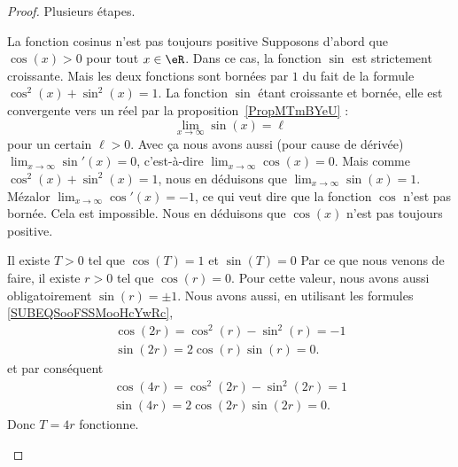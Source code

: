 \begin{proof}
	Plusieurs étapes.
	\begin{subproof}
		\item[La fonction cosinus n'est pas toujours positive]
		Supposons d'abord que \( \cos(x)>0\) pour tout \( x\in \eR\). Dans ce cas, la fonction \( \sin\) est strictement croissante. Mais les deux fonctions sont bornées par \( 1\) du fait de la formule \( \cos^2(x)+\sin^2(x)=1\). La fonction \( \sin\) étant croissante et bornée, elle est convergente vers un réel par la proposition~\ref{PropMTmBYeU} :
		\begin{equation}
			\lim_{x\to \infty} \sin(x)=\ell
		\end{equation}
		pour un certain \( \ell>0\). Avec ça nous avons aussi (pour cause de dérivée) \( \lim_{x\to \infty} \sin'(x)=0\), c'est-à-dire \( \lim_{x\to \infty} \cos(x)=0\). Mais comme \( \cos^2(x)+\sin^2(x)=1\), nous en déduisons que \( \lim_{x\to \infty} \sin(x)=1\). Mézalor \( \lim_{x\to \infty} \cos'(x)=-1\), ce qui veut dire que la fonction \( \cos\) n'est pas bornée. Cela est impossible. Nous en déduisons que \( \cos(x)\) n'est pas toujours positive.

		\item[Il existe \( T>0\) tel que \( \cos(T)=1\) et \( \sin(T)=0\)]
		Par ce que nous venons de faire, il existe \( r>0\) tel que \( \cos(r)=0\). Pour cette valeur, nous avons aussi obligatoirement \( \sin(r)=\pm 1\). Nous avons aussi, en utilisant les formules \eqref{SUBEQSooFSSMooHcYwRc},
		\begin{subequations}
			\begin{align}
				\cos(2r)=\cos^2(r)-\sin^2(r)=-1 \\
				\sin(2r)=2\cos(r)\sin(r)=0.
			\end{align}
		\end{subequations}
		et par conséquent
		\begin{subequations}
			\begin{align}
				\cos(4r)=\cos^2(2r)-\sin^2(2r)=1 \\
				\sin(4r)=2\cos(2r)\sin(2r)=0.
			\end{align}
		\end{subequations}
		Donc \( T=4r\) fonctionne.


\end{subproof}
\end{proof}
